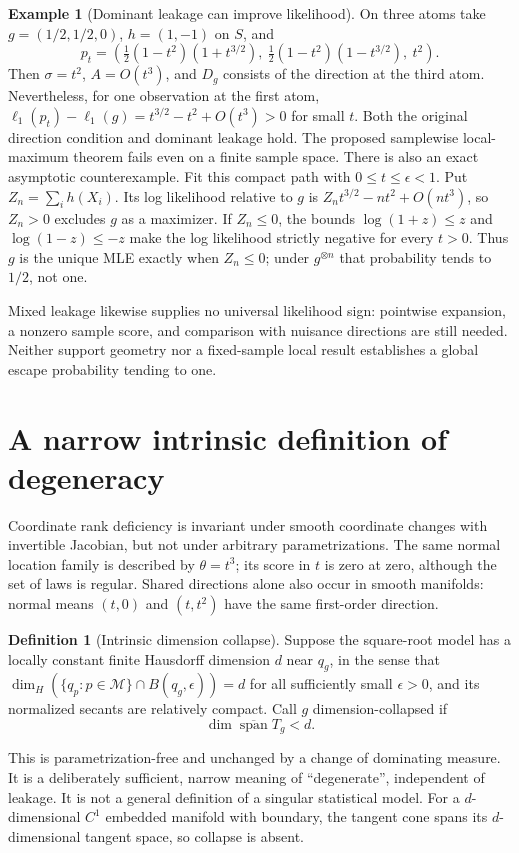 \documentclass[11pt]{article}
\newcommand{\cM}{\mathcal M}
\theoremstyle{definition}
\newtheorem{definition}{Definition}
\newtheorem{example}{Example}
\theoremstyle{remark}
\begin{document}
\begin{example}[Dominant leakage can improve likelihood]\label{ex:leak}
On three atoms take $g=(1/2,1/2,0)$, $h=(1,-1)$ on $S$, and
\[
 p_t=\left(\tfrac12(1-t^2)(1+t^{3/2}),\
           \tfrac12(1-t^2)(1-t^{3/2}),\ t^2\right).
\]
Then $\sigma=t^2$, $A=O(t^3)$, and $D_g$ consists of the direction at the
third atom. Nevertheless, for one observation at the first atom,
$\ell_1(p_t)-\ell_1(g)=t^{3/2}-t^2+O(t^3)>0$ for small $t$.
Both the original direction condition and dominant leakage hold. The proposed
samplewise local-maximum theorem fails even on a finite sample space.
There is also an exact asymptotic counterexample. Fit this compact path with
$0\le t\le\epsilon<1$. Put $Z_n=\sum_i h(X_i)$. Its log likelihood relative
to $g$ is $Z_n t^{3/2}-nt^2+O(nt^3)$, so $Z_n>0$ excludes $g$ as a
maximizer. If $Z_n\le0$, the bounds $\log(1+z)\le z$ and
$\log(1-z)\le-z$ make the log likelihood strictly negative for every $t>0$.
Thus $g$ is the unique MLE exactly when $Z_n\le0$; under $g^{\otimes n}$
that probability tends to $1/2$, not one.
\end{example}
Mixed leakage likewise supplies no universal likelihood sign: pointwise
expansion, a nonzero sample score, and comparison with nuisance directions
are still needed. Neither support geometry nor a fixed-sample local result
establishes a global escape probability tending to one.

\section{A narrow intrinsic definition of degeneracy}
Coordinate rank deficiency is invariant under smooth coordinate changes with
invertible Jacobian, but not under arbitrary parametrizations. The same
normal location family is described by $\theta=t^3$; its score in $t$ is zero
at zero, although the set of laws is regular. Shared directions alone also
occur in smooth manifolds: normal means $(t,0)$ and $(t,t^2)$ have the same
first-order direction.

\begin{definition}[Intrinsic dimension collapse]\label{def:collapse}
Suppose the square-root model has a locally constant finite Hausdorff
dimension $d$ near $q_g$, in the sense that
$\dim_H(\{q_p:p\in\cM\}\cap B(q_g,\epsilon))=d$ for all sufficiently
small $\epsilon>0$, and its normalized secants are relatively compact.
Call $g$ dimension-collapsed if
\[
 \dim\overline{\operatorname{span}} T_g<d.
\]
\end{definition}
This is parametrization-free and unchanged by a change of dominating measure.
It is a deliberately sufficient, narrow meaning of ``degenerate'', independent
of leakage. It is not a general definition of a singular statistical model.
For a $d$-dimensional $C^1$ embedded manifold with boundary, the tangent cone
spans its $d$-dimensional tangent space, so collapse is absent.
\end{document}
